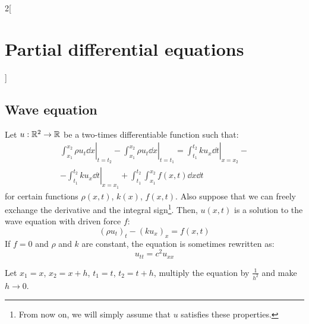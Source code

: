 \documentclass[../../../main_math.tex]{subfiles}
\begin{document}
\begin{multicols}{2}[\section{Partial differential equations}]
  \subsection{Wave equation}
  \begin{proposition}
    Let $u:\mathbb{R}^2\rightarrow\mathbb{R}$ be a two-times differentiable function such that:
    \begin{multline*}
      \left.\int_{x_1}^{x_2}\rho u_t\dd{x}\right|_{t=t_2}-\left.\int_{x_1}^{x_2}\rho u_t\dd{x}\right|_{t=t_1}=\left.\int_{t_1}^{t_2}ku_x\dd{t}\right|_{x=x_2}-\\-\left.\int_{t_1}^{t_2}ku_x\dd{t}\right|_{x=x_1}+\int_{t_1}^{t_2}\int_{x_1}^{x_2}f(x,t)\dd{x}\dd{t}
    \end{multline*}
    for certain functions $\rho(x,t)$, $k(x)$, $f(x,t)$. Also suppose that we can freely exchange the derivative and the integral sign\footnote{From now on, we will simply assume that $u$ satisfies these properties.}. Then, $u(x,t)$ is a solution to the wave equation with driven force $f$:
    $${(\rho u_{t})}_t-{(ku_x)}_x=f(x,t)$$
    If $f=0$ and $\rho$ and $k$ are constant, the equation is sometimes rewritten as:
    \begin{equation}\label{PDE:waveeq}
      u_{tt}=c^2 u_{xx}
    \end{equation}
  \end{proposition}
  \begin{sproof}
    Let $x_1 = x$, $x_2=x+h$, $t_1=t$, $t_2=t+h$, multiply the equation by $\frac{1}{h^2}$ and make $h\to 0$.
  \end{sproof}

\end{multicols}
\end{document}

